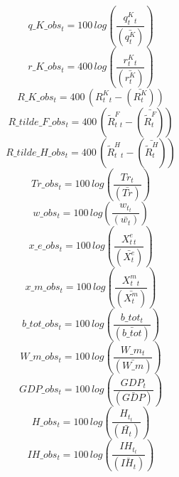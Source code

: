 \begin{dmath}
{q\_K\_obs_{t}}=100\, log\left(\frac{{  q^K_t _{t}}}{(\bar{  q^K_t })}\right)
\end{dmath}
\begin{dmath}
{r\_K\_obs_{t}}=400\, log\left(\frac{{ r^K_t  _{t}}}{(\bar{ r^K_t  })}\right)
\end{dmath}
\begin{dmath}
{R\_K\_obs_{t}}=400\, \left({  R^K_t _{t}}-(\bar{  R^K_t })\right)
\end{dmath}
\begin{dmath}
{R\_tilde\_F\_obs_{t}}=400\, \left({  \tilde{R}^F_t _{t}}-(\bar{  \tilde{R}^F_t })\right)
\end{dmath}
\begin{dmath}
{R\_tilde\_H\_obs_{t}}=400\, \left({  \tilde{R}^H_t _{t}}-(\bar{  \tilde{R}^H_t })\right)
\end{dmath}
\begin{dmath}
{Tr\_obs_{t}}=100\, log\left(\frac{{ Tr  _{t}}}{(\bar{ Tr  })}\right)
\end{dmath}
\begin{dmath}
{w\_obs_{t}}=100\, log\left(\frac{{ w_t  _{t}}}{(\bar{ w_t  })}\right)
\end{dmath}
\begin{dmath}
{x\_e\_obs_{t}}=100\, log\left(\frac{{ X^e_t  _{t}}}{(\bar{ X^e_t  })}\right)
\end{dmath}
\begin{dmath}
{x\_m\_obs_{t}}=100\, log\left(\frac{{ X^m_t  _{t}}}{(\bar{ X^m_t  })}\right)
\end{dmath}
\begin{dmath}
{b\_tot\_obs_{t}}=100\, log\left(\frac{{b\_tot_{t}}}{(\bar{b\_tot})}\right)
\end{dmath}
\begin{dmath}
{W\_m\_obs_{t}}=100\, log\left(\frac{{W\_m_{t}}}{(\bar{W\_m})}\right)
\end{dmath}
\begin{dmath}
{GDP\_obs_{t}}=100\, log\left(\frac{{GDP_{t}}}{(\bar{GDP})}\right)
\end{dmath}
\begin{dmath}
{H\_obs_{t}}=100\, log\left(\frac{{ H_t _{t}}}{(\bar{ H_t })}\right)
\end{dmath}
\begin{dmath}
{IH\_obs_{t}}=100\, log\left(\frac{{IH_t_{t}}}{(\bar{IH_t})}\right)
\end{dmath}

